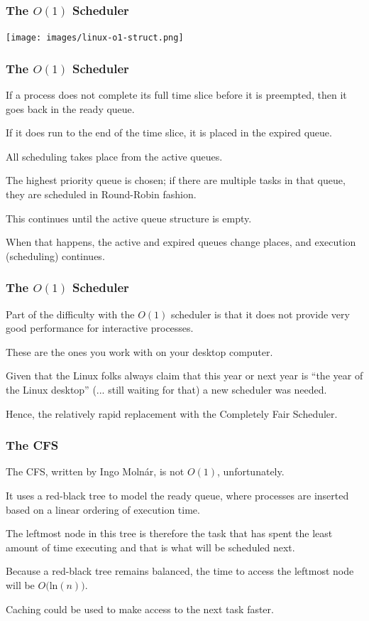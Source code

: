 \begin{frame}
\frametitle{The $O(1)$ Scheduler}


\begin{center}
	\texttt{[image: images/linux-o1-struct.png]}
\end{center}

\end{frame}

\begin{frame}
\frametitle{The $O(1)$ Scheduler}

If a process does not complete its full time slice before it is preempted, then it goes back in the ready queue. 

If it does run to the end of the time slice, it is placed in the expired queue. 

All scheduling takes place from the active queues. 

The highest priority queue is chosen; if there are multiple tasks in that queue, they are scheduled in Round-Robin fashion. 

This continues until the active queue structure is empty. 

When that happens, the active and expired queues change places, and execution (scheduling) continues.


\end{frame}

\begin{frame}
\frametitle{The $O(1)$ Scheduler}

Part of the difficulty with the $O(1)$ scheduler is that it does not provide very good performance for interactive processes.

These are the ones you work with on your desktop computer. 

Given that the Linux folks always claim that this year or next year is ``the year of the Linux desktop'' (... still waiting for that) a new scheduler was needed. 

Hence, the relatively rapid replacement with the Completely Fair Scheduler.

\end{frame}

\begin{frame}
\frametitle{The CFS}

The CFS, written by Ingo Moln\'ar, is not $O(1)$, unfortunately. 

It uses a red-black tree to model the ready queue, where processes are inserted based on a linear ordering of execution time. 

The leftmost node in this tree is therefore the task that has spent the least amount of time executing and that is what will be scheduled next. 

Because a red-black tree remains balanced, the time to access the leftmost node will be $O($ln$(n))$.

Caching could be used to make access to the next task faster.


\end{frame}

